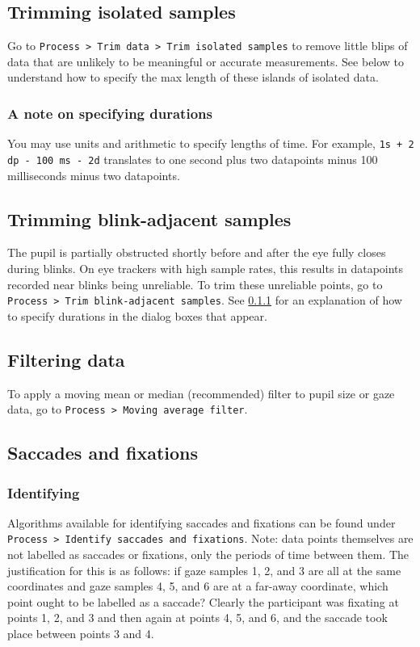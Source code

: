 \documentclass{article}
\begin{document}
\subsection{Trimming isolated samples}
Go to \texttt{Process > Trim data > Trim isolated samples} to remove little blips of data that are unlikely to be meaningful or accurate measurements. See below to understand how to specify the max length of these islands of isolated data.
\subsubsection{A note on specifying durations} \label{timestr_explanation}
You may use units and arithmetic to specify lengths of time. For example, \texttt{1s + 2 dp - 100 ms - 2d} translates to one second plus two datapoints minus 100 milliseconds minus two datapoints.
\subsection{Trimming blink-adjacent samples}
The pupil is partially obstructed shortly before and after the eye fully closes during blinks. On eye trackers with high sample rates, this results in datapoints recorded near blinks being unreliable. To trim these unreliable points, go to \texttt{Process > Trim blink-adjacent samples}. See \ref{timestr_explanation} for an explanation of how to specify durations in the dialog boxes that appear.
\subsection{Filtering data}
To apply a moving mean or median (recommended) filter to pupil size or gaze data, go to \texttt{Process > Moving average filter}.
\subsection{Saccades and fixations}
\subsubsection{Identifying}
Algorithms available for identifying saccades and fixations can be found under \texttt{Process > Identify saccades and fixations}. Note: data points themselves are not labelled as saccades or fixations, only the periods of time between them. The justification for this is as follows: if gaze samples 1, 2, and 3 are all at the same coordinates and gaze samples 4, 5, and 6 are at a far-away coordinate, which point ought to be labelled as a saccade? Clearly the participant was fixating at points 1, 2, and 3 and then again at points 4, 5, and 6, and the saccade took place between points 3 and 4.
\end{document}
